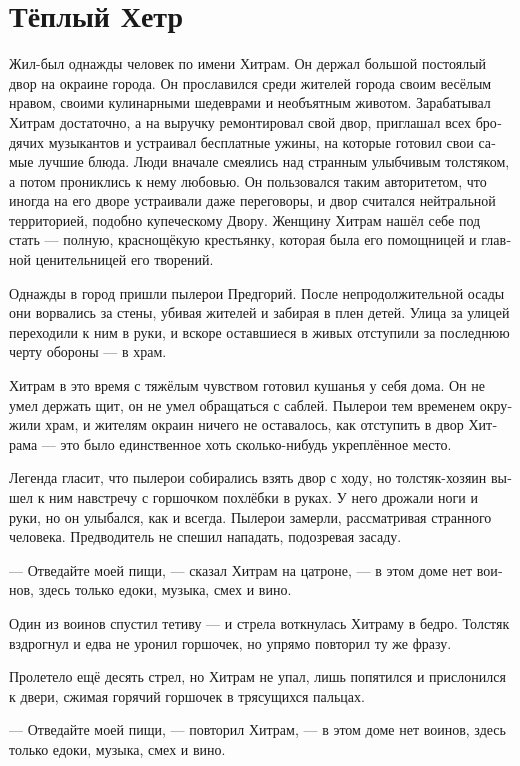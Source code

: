 \documentclass[a4paper,12pt,fleqn]{book}\usepackage{cooltooltips}\usepackage{polyglossia}\setdefaultlanguage[babelshorthands=true]{russian}\setotherlanguage{english}\defaultfontfeatures{Ligatures=TeX,Mapping=tex-text} \usepackage{xcolor}\definecolor{lightgray}{HTML}{bbbbbb}\color{lightgray}\newcommand{\ml}[3]{\textenglish{\textcolor{black}{#3}}}
\begin{document}
{\section{Тёплый Хетр}

Жил-был однажды человек по имени Хитрам.
Он держал большой постоялый двор на окраине города.
Он прославился среди жителей города своим весёлым нравом, своими кулинарными шедеврами и необъятным животом.
Зарабатывал Хитрам достаточно, а на выручку ремонтировал свой двор, приглашал всех бродячих музыкантов и устраивал бесплатные ужины, на которые готовил свои самые лучшие блюда.
Люди вначале смеялись над странным улыбчивым толстяком, а потом прониклись к нему любовью.
Он пользовался таким авторитетом, что иногда на его дворе устраивали даже переговоры, и двор считался нейтральной территорией, подобно купеческому Двору.
Женщину Хитрам нашёл себе под стать --- полную, краснощёкую крестьянку, которая была его помощницей и главной ценительницей его творений.

Однажды в город пришли пылерои Предгорий.
После непродолжительной осады они ворвались за стены, убивая жителей и забирая в плен детей.
Улица за улицей переходили к ним в руки, и вскоре оставшиеся в живых отступили за последнюю черту обороны --- в храм.

Хитрам в это время с тяжёлым чувством готовил кушанья у себя дома.
Он не умел держать щит, он не умел обращаться с саблей.
Пылерои тем временем окружили храм, и жителям окраин ничего не оставалось, как отступить в двор Хитрама --- это было единственное хоть сколько-нибудь укреплённое место.

Легенда гласит, что пылерои собирались взять двор с ходу, но толстяк-хозяин вышел к ним навстречу с горшочком похлёбки в руках.
У него дрожали ноги и руки, но он улыбался, как и всегда.
Пылерои замерли, рассматривая странного человека.
Предводитель не спешил нападать, подозревая засаду.

--- Отведайте моей пищи, --- сказал Хитрам на цатроне, --- в этом доме нет воинов, здесь только едоки, музыка, смех и вино.

Один из воинов спустил тетиву --- и стрела воткнулась Хитраму в бедро.
Толстяк вздрогнул и едва не уронил горшочек, но упрямо повторил ту же фразу.

Пролетело ещё десять стрел, но Хитрам не упал, лишь попятился и прислонился к двери, сжимая горячий горшочек в трясущихся пальцах.

--- Отведайте моей пищи, --- повторил Хитрам, --- в этом доме нет воинов, здесь только едоки, музыка, смех и вино.

}
\end{document}
